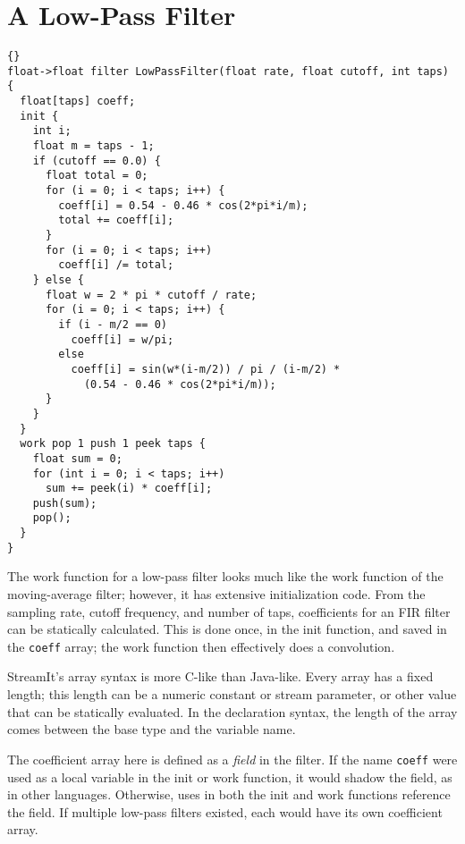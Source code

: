 \section{A Low-Pass Filter}

\begin{lstlisting}{}
float->float filter LowPassFilter(float rate, float cutoff, int taps) {
  float[taps] coeff;
  init {
    int i;
    float m = taps - 1;
    if (cutoff == 0.0) {
      float total = 0;
      for (i = 0; i < taps; i++) {
        coeff[i] = 0.54 - 0.46 * cos(2*pi*i/m);
        total += coeff[i];
      }
      for (i = 0; i < taps; i++)
        coeff[i] /= total;
    } else {
      float w = 2 * pi * cutoff / rate;
      for (i = 0; i < taps; i++) {
        if (i - m/2 == 0)
          coeff[i] = w/pi;
        else
          coeff[i] = sin(w*(i-m/2)) / pi / (i-m/2) *
            (0.54 - 0.46 * cos(2*pi*i/m));
      }
    }
  }
  work pop 1 push 1 peek taps {
    float sum = 0;
    for (int i = 0; i < taps; i++)
      sum += peek(i) * coeff[i];
    push(sum);
    pop();
  }
}
\end{lstlisting}

The work function for a low-pass filter looks much like the work
function of the moving-average filter; however, it has extensive
initialization code.  From the sampling rate, cutoff frequency, and
number of taps, coefficients for an FIR filter can be statically
calculated.  This is done once, in the init function, and saved in the
\lstinline|coeff| array; the work function then effectively does a
convolution.

StreamIt's array syntax is more C-like than Java-like.  Every array
has a fixed length; this length can be a numeric constant or stream
parameter, or other value that can be statically evaluated.  In the
declaration syntax, the length of the array comes between the base
type and the variable name.

The coefficient array here is defined as a \emph{field} in the
filter.  If the name \lstinline|coeff| were used as a local variable
in the init or work function, it would shadow the field, as in other
languages.  Otherwise, uses in both the init and work functions
reference the field.  If multiple low-pass filters existed, each would
have its own coefficient array.
